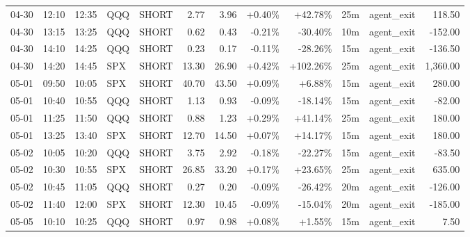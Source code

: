 \documentclass[11pt,a4paper]{article}
\begin{document}
\begin{center}
\begin{longtable}{>{\color{txtmain}}l l l l l r r r r r >{\color{txtmain}}l r}
04-30 & 12:10 & 12:35 & QQQ & SHORT & 2.77 & 3.96 & \textcolor{wingreen}{+0.40\%} & \textcolor{wingreen}{+42.78\%} & 25m & agent\_exit & \textcolor{wingreen}{118.50} \\
04-30 & 13:15 & 13:25 & QQQ & SHORT & 0.62 & 0.43 & \textcolor{lossred}{-0.21\%} & \textcolor{lossred}{-30.40\%} & 10m & agent\_exit & \textcolor{lossred}{-152.00} \\
04-30 & 14:10 & 14:25 & QQQ & SHORT & 0.23 & 0.17 & \textcolor{lossred}{-0.11\%} & \textcolor{lossred}{-28.26\%} & 15m & agent\_exit & \textcolor{lossred}{-136.50} \\
04-30 & 14:20 & 14:45 & SPX & SHORT & 13.30 & 26.90 & \textcolor{wingreen}{+0.42\%} & \textcolor{wingreen}{+102.26\%} & 25m & agent\_exit & \textcolor{wingreen}{1,360.00} \\
05-01 & 09:50 & 10:05 & SPX & SHORT & 40.70 & 43.50 & \textcolor{wingreen}{+0.09\%} & \textcolor{wingreen}{+6.88\%} & 15m & agent\_exit & \textcolor{wingreen}{280.00} \\
05-01 & 10:40 & 10:55 & QQQ & SHORT & 1.13 & 0.93 & \textcolor{lossred}{-0.09\%} & \textcolor{lossred}{-18.14\%} & 15m & agent\_exit & \textcolor{lossred}{-82.00} \\
05-01 & 11:25 & 11:50 & QQQ & SHORT & 0.88 & 1.23 & \textcolor{wingreen}{+0.29\%} & \textcolor{wingreen}{+41.14\%} & 25m & agent\_exit & \textcolor{wingreen}{180.00} \\
05-01 & 13:25 & 13:40 & SPX & SHORT & 12.70 & 14.50 & \textcolor{wingreen}{+0.07\%} & \textcolor{wingreen}{+14.17\%} & 15m & agent\_exit & \textcolor{wingreen}{180.00} \\
05-02 & 10:05 & 10:20 & QQQ & SHORT & 3.75 & 2.92 & \textcolor{lossred}{-0.18\%} & \textcolor{lossred}{-22.27\%} & 15m & agent\_exit & \textcolor{lossred}{-83.50} \\
05-02 & 10:30 & 10:55 & SPX & SHORT & 26.85 & 33.20 & \textcolor{wingreen}{+0.17\%} & \textcolor{wingreen}{+23.65\%} & 25m & agent\_exit & \textcolor{wingreen}{635.00} \\
05-02 & 10:45 & 11:05 & QQQ & SHORT & 0.27 & 0.20 & \textcolor{lossred}{-0.09\%} & \textcolor{lossred}{-26.42\%} & 20m & agent\_exit & \textcolor{lossred}{-126.00} \\
05-02 & 11:40 & 12:00 & SPX & SHORT & 12.30 & 10.45 & \textcolor{lossred}{-0.09\%} & \textcolor{lossred}{-15.04\%} & 20m & agent\_exit & \textcolor{lossred}{-185.00} \\
05-05 & 10:10 & 10:25 & QQQ & SHORT & 0.97 & 0.98 & \textcolor{wingreen}{+0.08\%} & \textcolor{wingreen}{+1.55\%} & 15m & agent\_exit & \textcolor{wingreen}{7.50} \\

\end{longtable}
\end{center}
\end{document}
